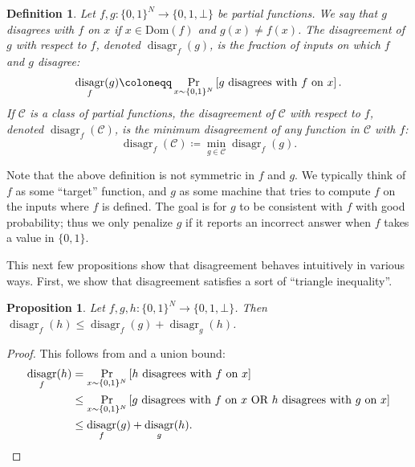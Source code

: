 \documentclass[11pt]{article}%
\newtheorem{definition}[theorem]{Definition}
\newtheorem{proposition}[theorem]{Proposition}
\newcommand{\Dom}{\mathrm{Dom}}
\DeclareMathOperator{\disagr}{\mathrm{disagr}}
\begin{document}
\begin{definition}
\label{def:disagreement}
Let $f, g: \{0,1\}^N \to \{0,1,\bot\}$ be partial functions. We say that \emph{$g$ disagrees with $f$ on $x$} if $x \in \Dom(f)$ and $g(x) \neq f(x)$. The \emph{disagreement of $g$ with respect to $f$}, denoted $\disagr_f(g)$, is the fraction of inputs on which $f$ and $g$ disagree:
\[\disagr_f(g) \coloneqq \Pr_{x \sim \{0,1\}^N} \left[ g \text{ \rm disagrees with } f \text{ \rm on } x \right].\]
If $\mathcal{C}$ is a class of partial functions, the \emph{disagreement of $\mathcal{C}$ with respect to $f$}, denoted $\disagr_f(\mathcal{C})$, is the minimum disagreement of any function in $\mathcal{C}$ with $f$:
\[
\disagr_f(\mathcal{C}) \coloneqq \min_{g \in \mathcal{C}} \disagr_f(g).
\]
\end{definition}

Note that the above definition is not symmetric in $f$ and $g$. We typically think of $f$ as some ``target'' function, and $g$ as some machine that tries to compute $f$ on the inputs where $f$ is defined. The goal is for $g$ to be consistent with $f$ with good probability; thus we only penalize $g$ if it reports an incorrect answer when $f$ takes a value in $\{0,1\}$.

This next few propositions show that disagreement behaves intuitively in various ways. First, we show that disagreement satisfies a sort of ``triangle inequality''.

\begin{proposition}
\label{prop:disagr_triangle_inequality}
Let $f, g, h: \{0,1\}^N \to \{0,1,\bot\}$. Then $\disagr_f(h) \le \disagr_f(g) + \disagr_g(h)$. 
\end{proposition}
\begin{proof}
This follows from  and a union bound:
\begin{align*}
\disagr_f(h) &= \Pr_{x \sim \{0,1\}^N} \left[ h \text{ \rm disagrees with } f \text{ \rm on } x \right]\\
&\le \Pr_{x \sim \{0,1\}^N} \left[ g \text{ \rm disagrees with } f \text{ \rm on } x \text{ \rm OR } h \text{ \rm disagrees with } g \text{ \rm on } x \right]\\
&\le \disagr_f(g) + \disagr_g(h).\qedhere
\end{align*}
\end{proof}
\end{document}
